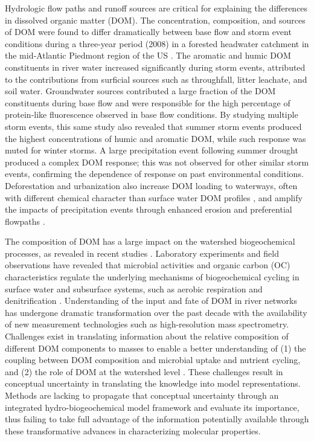 \documentclass[preprint,review, 12pt]{elsarticle}
\begin{document}
Hydrologic flow paths and runoff sources are critical for explaining the differences in dissolved organic matter (DOM). The concentration, composition, and sources of DOM were found to differ dramatically between base flow and storm event conditions during a three{-}year period (2008) in a forested headwater catchment in the mid{‐}Atlantic Piedmont region of the US \citep{Inamdar2011}. The aromatic and humic DOM constituents in river water increased significantly during storm events, attributed to the contributions from surficial sources such as throughfall, litter leachate, and soil water. Groundwater sources contributed a large fraction of the DOM constituents during base flow and were responsible for the high percentage of protein‐like fluorescence observed in base flow conditions. By studying multiple storm events, this same study \citep{Inamdar2011} also revealed that summer storm events produced the highest concentrations of humic and aromatic DOM, while such response was muted for winter storms. A large precipitation event following summer drought produced a complex DOM response; this was not observed for other similar storm events, confirming the dependence of response on past environmental conditions. Deforestation and urbanization also increase DOM loading to waterways, often with different chemical character than surface water DOM profiles \citep{Williams2010, Wilson2009, Fu2007, McEnroe2013}, and amplify the impacts of precipitation events through enhanced erosion and preferential flowpaths \citep{Burns2012, Heaney1984, Paul2001, Hawley2016}.

The composition of DOM has a large impact on the watershed biogeochemical processes, as revealed in recent studies \citep{Stegen2018,Goldman2017a,Graham2017d, Graham2018}. Laboratory experiments and field observations have revealed that microbial activities and organic carbon (OC) characteristics regulate the underlying mechanisms of biogeochemical cycling in surface water and subsurface systems, such as aerobic respiration and denitrification \citep{Stegen2018,Goldman2017a,Graham2017d, Graham2018}. Understanding of the input and fate of DOM in river networks has undergone dramatic transformation over the past decade with the availability of new measurement technologies such as high-resolution mass spectrometry. Challenges exist in translating information about the relative composition of different DOM components to masses to enable a better understanding of (1) the coupling between DOM composition and microbial uptake and nutrient cycling, and (2) the role of DOM at the watershed level \citep{Inamdar2011}. These challenges result in conceptual uncertainty in translating the knowledge into model representations. Methods are lacking to propagate that conceptual uncertainty through an integrated hydro-biogeochemical model framework and evaluate its importance, thus failing to take full advantage of the information potentially available through these transformative advances in characterizing molecular properties.
            
\end{document}
